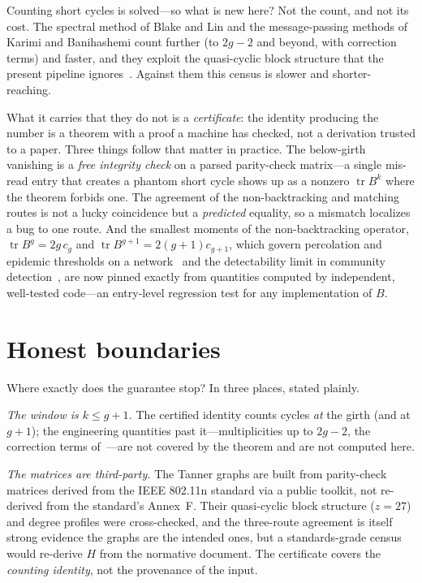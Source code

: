 \documentclass[11pt]{article}
\DeclareMathOperator{\tr}{tr}
\begin{document}
Counting short cycles is solved---so what is new here? Not the count, and not its cost. The
spectral method of Blake and Lin and the message-passing methods of Karimi and Banihashemi
count further (to $2g-2$ and beyond, with correction terms) and faster, and they exploit the
quasi-cyclic block structure that the present pipeline ignores~\cite{BlakeLin2018,
KarimiBanihashemi2013,Dehghan2018}. Against them this census is slower and shorter-reaching.

What it carries that they do not is a \emph{certificate}: the identity producing the number
is a theorem with a proof a machine has checked, not a derivation trusted to a paper. Three
things follow that matter in practice. The below-girth vanishing is a \emph{free integrity
check} on a parsed parity-check matrix---a single mis-read entry that creates a phantom short
cycle shows up as a nonzero $\tr B^k$ where the theorem forbids one. The agreement of the
non-backtracking and matching routes is not a lucky coincidence but a \emph{predicted}
equality, so a mismatch localizes a bug to one route. And the smallest moments of the
non-backtracking operator, $\tr B^g = 2g\,c_g$ and $\tr B^{g+1} = 2(g{+}1)c_{g+1}$, which
govern percolation and epidemic thresholds on a network~\cite{KarrerNewman2014} and the
detectability limit in community detection~\cite{Krzakala2013}, are now pinned exactly from
quantities computed by independent, well-tested code---an entry-level regression test for any
implementation of $B$.

\section{Honest boundaries}
\label{sec:boundary}

Where exactly does the guarantee stop? In three places, stated plainly.

\emph{The window is $k \le g+1$.} The certified identity counts cycles \emph{at} the girth
(and at $g+1$); the engineering quantities past it---multiplicities up to $2g-2$, the
correction terms of~\cite{BlakeLin2018,Dehghan2018}---are not covered by the theorem and are
not computed here.

\emph{The matrices are third-party.} The Tanner graphs are built from parity-check matrices
derived from the IEEE 802.11n standard via a public toolkit, not re-derived from the
standard's Annex~F. Their quasi-cyclic block structure ($z = 27$) and degree profiles were
cross-checked, and the three-route agreement is itself strong evidence the graphs are the
intended ones, but a standards-grade census would re-derive $H$ from the normative document.
The certificate covers the \emph{counting identity}, not the provenance of the input.
\end{document}
